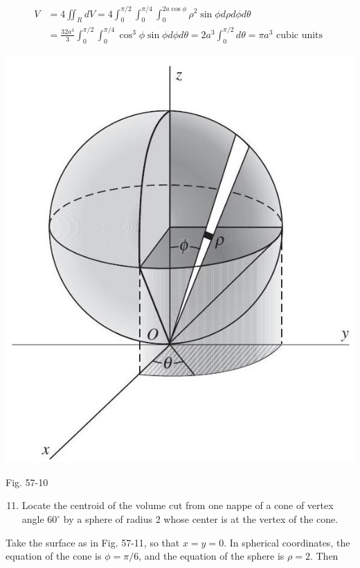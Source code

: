 \documentclass[10pt]{article}
\begin{document}
$$
\begin{aligned}
V & =4 \iint_{R} d V=4 \int_{0}^{\pi / 2} \int_{0}^{\pi / 4} \int_{0}^{2 a \cos \phi} \rho^{2} \sin \phi d \rho d \phi d \theta \\
& =\frac{32 a^{3}}{3} \int_{0}^{\pi / 2} \int_{0}^{\pi / 4} \cos ^{3} \phi \sin \phi d \phi d \theta=2 a^{3} \int_{0}^{\pi / 2} d \theta=\pi a^{3} \text { cubic units }
\end{aligned}
$$

\begin{center}
\includegraphics[max width=\textwidth]{2024_04_20_fe2e8e718cc0fcd63d1bg-07}
\end{center}

Fig. 57-10

\begin{enumerate}
  \setcounter{enumi}{10}
  \item Locate the centroid of the volume cut from one nappe of a cone of vertex angle $60^{\circ}$ by a sphere of radius 2 whose center is at the vertex of the cone.
\end{enumerate}

Take the surface as in Fig. 57-11, so that $x=y=0$. In spherical coordinates, the equation of the cone is $\phi=\pi / 6$, and the equation of the sphere is $\rho=2$. Then
\end{document}
